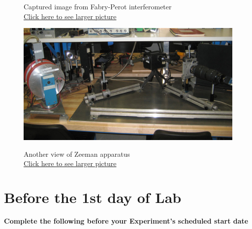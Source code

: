 \documentclass{../lab}
\begin{document}
\begin{figure}[!h]
  \caption{Captured image from Fabry-Perot interferometer \\
  \href{http://experimentationlab.berkeley.edu/sites/default/files/images/Atm_5.jpg}{Click here to see larger picture}}
  \label{fig:ImagedFringes}
\endminipage\hfill
{}
  \href{http://experimentationlab.berkeley.edu/sites/default/files/images/ATM_Zeeman_3489-Crop-Lg.jpg}{\includegraphics[width=\linewidth,keepaspectratio]{images/ATM_Zeeman_3489-Crop-Lg.jpg}}
  \caption{Another view of Zeeman apparatus \\ \href{http://experimentationlab.berkeley.edu/sites/default/files/images/ATM_Zeeman_3489-Crop-Lg.jpg}{Click here to see larger picture}}\label{fig:ZeemanApparatus2}
\endminipage
\end{figure}

\section{Before the 1st day of Lab}

\textbf{Complete the following before your Experiment's scheduled start date}
\end{document}
